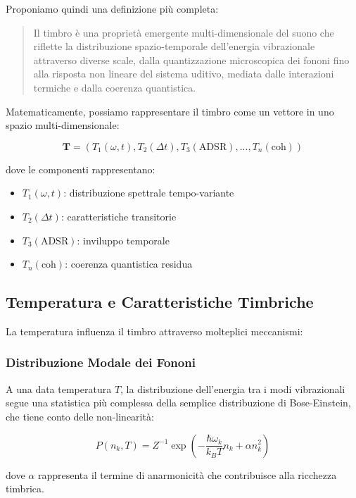 \documentclass{gs-adonis}
\providecommand{\tightlist}{%
  \setlength{\itemsep}{0pt}\setlength{\parskip}{0pt}}
\begin{document}
Proponiamo quindi una definizione più completa:

\begin{quote}
Il timbro è una proprietà emergente multi-dimensionale del suono che
riflette la distribuzione spazio-temporale dell'energia vibrazionale
attraverso diverse scale, dalla quantizzazione microscopica dei fononi
fino alla risposta non lineare del sistema uditivo, mediata dalle
interazioni termiche e dalla coerenza quantistica.
\end{quote}

Matematicamente, possiamo rappresentare il timbro come un vettore in uno
spazio multi-dimensionale:

\[\mathbf{T} = \left(T_1(\omega, t), T_2(\Delta t), T_3(\text{ADSR}), ..., T_n(\text{coh})\right)\]

dove le componenti rappresentano:

\begin{itemize}
\tightlist
\item
  \(T_1(\omega, t)\): distribuzione spettrale tempo-variante
\item
  \(T_2(\Delta t)\): caratteristiche transitorie
\item
  \(T_3(\text{ADSR})\): inviluppo temporale
\item
  \(T_n(\text{coh})\): coerenza quantistica residua
\end{itemize}

\subsection{Temperatura e Caratteristiche
Timbriche}\label{temperatura-e-caratteristiche-timbriche}

La temperatura influenza il timbro attraverso molteplici meccanismi:

\subsubsection{Distribuzione Modale dei
Fononi}\label{distribuzione-modale-dei-fononi}

A una data temperatura \(T\), la distribuzione dell'energia tra i modi
vibrazionali segue una statistica più complessa della semplice
distribuzione di Bose-Einstein, che tiene conto delle non-linearità:

\[P(n_k, T) = Z^{-1}\exp\left(-\frac{\hbar\omega_k}{k_BT}n_k + \alpha n_k^2\right)\]

dove \(\alpha\) rappresenta il termine di anarmonicità che contribuisce
alla ricchezza timbrica.
\end{document}
